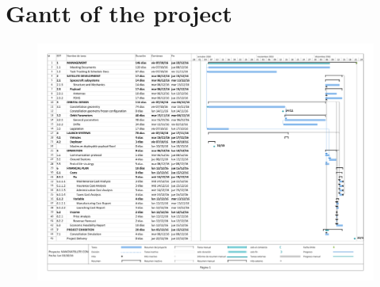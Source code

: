\section{Gantt of the project}
\begin{figure}[h]
\includegraphics[width=1.1\textwidth]{./external_pdf/wbs_final.pdf}
\end{figure}
